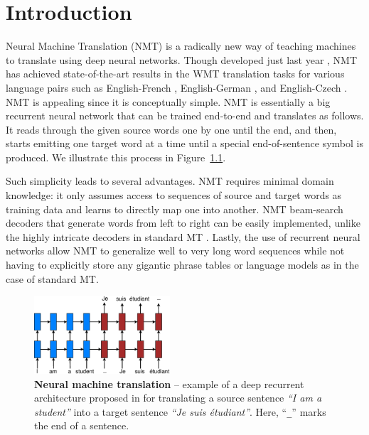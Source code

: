 \chapter{Introduction}
Neural Machine Translation (NMT) is a radically new way of teaching machines to
translate using deep neural networks. Though developed just last year
\cite{sutskever14,cho14},
NMT has achieved state-of-the-art results in the WMT translation tasks for
various language pairs such as
English-French \cite{luong15}, English-German \cite{jean15,luong15attn}, and
English-Czech \cite{jean15wmt}. NMT is appealing since it is conceptually
simple. NMT is essentially a big recurrent neural network that can be trained
end-to-end and translates as follows. It reads through the given source
words one by one until the
end, and then, starts emitting one target
word at a time until a special end-of-sentence symbol is produced. We illustrate
this process in Figure~\ref{f:nmt}. 

Such simplicity leads to several advantages. 
NMT requires minimal domain knowledge: it only assumes access to
sequences of source and target words as training data and learns to directly
map one into another. NMT beam-search decoders that
generate words from left to right can be easily implemented, unlike the highly
intricate decoders in standard MT \cite{Koehn:2003:SMT}. Lastly, the use of
recurrent neural networks allow NMT to generalize well to very long word
sequences while not having to 
explicitly store any gigantic
phrase tables or language models as in the case of standard MT.
\begin{figure}
\centering
\includegraphics[width=0.45\textwidth, clip=true, trim= 0 0 0 0]{nmt_basic.eps} %
\caption{{\bf Neural machine translation} -- example of a deep recurrent
architecture proposed in \cite{sutskever14} for
translating a source sentence {\it ``I am a student''} into a target sentence
{\it ``Je suis étudiant''}. Here, ``\texttt{\_}'' marks the end of a sentence.
} 
\label{f:nmt}
\end{figure}




